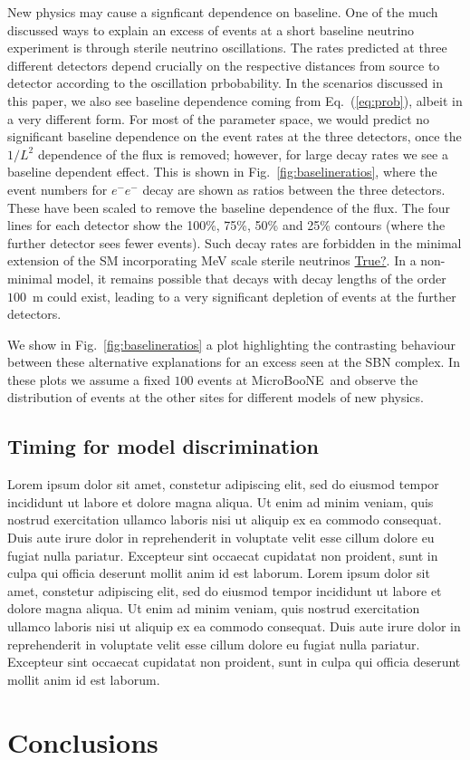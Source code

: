 \documentclass[11pt, a4paper]{article}
\newcommand{\refeq}[1]{Eq.~(\ref{#1})}
\newcommand{\reffig}[1]{Fig.~\ref{#1}}
\def\muboone{MicroBooNE}
\newcommand{\lorem}{ \textcolor[rgb]{0.8,0.8,0.8}{Lorem ipsum dolor sit amet, constetur
adipiscing elit, sed do eiusmod tempor incididunt ut labore et dolore magna
aliqua. Ut enim ad minim veniam, quis nostrud exercitation ullamco laboris nisi
ut aliquip ex ea commodo consequat. Duis aute irure dolor in reprehenderit in
voluptate velit esse cillum dolore eu fugiat nulla pariatur. Excepteur sint
occaecat cupidatat non proident, sunt in culpa qui officia deserunt mollit anim
id est laborum.}}
\newcommand{\newtext}[2]{\textcolor{#1}{\ul{#2}}}
\begin{document}
New physics may cause a signficant dependence on baseline. One of the much
discussed ways to explain an excess of events at a short baseline neutrino
experiment is through sterile neutrino oscillations. The rates predicted at
three different detectors depend crucially on the respective distances from
source to detector according to the oscillation prbobability. In the scenarios
discussed in this paper, we also see baseline dependence coming from
\refeq{eq:prob}, albeit in a very different form. For most of the parameter
space, we would predict no significant baseline dependence on the event rates
at the three detectors, once the $1/L^2$ dependence of the flux is removed;
however, for large decay rates we see a baseline dependent effect. This is
shown in \reffig{fig:baselineratios}, where the event numbers for $e^-e^-$
decay are shown as ratios between the three detectors. These have been scaled
to remove the baseline dependence of the flux.  The four lines for each
detector show the 100\%, 75\%, 50\% and 25\% contours (where the further
detector sees fewer events). Such decay rates are forbidden in the minimal
extension of the SM incorporating MeV scale sterile neutrinos
\newtext{PB}{True?}. In a non-minimal model, it remains possible that decays
with decay lengths of the order $100$~m could exist, leading to a very 
significant depletion of events at the further detectors.

We show in \reffig{fig:baselineratios} a plot highlighting the contrasting
behaviour between these alternative explanations for an excess seen at the SBN
complex. In these plots we assume a fixed $100$ events at \muboone\ and observe
the distribution of events at the other sites for different models of new
physics.

\subsection{\label{sec:timing_physics}Timing for model discrimination}

\lorem\lorem

\section{Conclusions}
\end{document}
